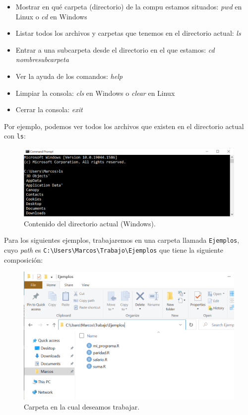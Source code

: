 \documentclass[
]{book}
\providecommand{\tightlist}{%
  \setlength{\itemsep}{0pt}\setlength{\parskip}{0pt}}
\begin{document}
\begin{itemize}
\tightlist
\item
  Mostrar en qué carpeta (directorio) de la compu estamos situados: \emph{pwd} en Linux o \emph{cd} en Windows
\item
  Listar todos los archivos y carpetas que tenemos en el directorio actual: \emph{ls}
\item
  Entrar a una subcarpeta desde el directorio en el que estamos: \emph{cd nombresubcarpeta}
\item
  Ver la ayuda de los comandos: \emph{help}
\item
  Limpiar la consola: \emph{cls} en Windows o \emph{clear} en Linux
\item
  Cerrar la consola: \emph{exit}
\end{itemize}

Por ejemplo, podemos ver todos los archivos que existen en el directorio actual con \texttt{ls}:

\begin{figure}

{\centering \includegraphics[width=0.8\linewidth]{images/07_otros/terminal3} 

}

\caption{Contenido del directorio actual (Windows).}\label{fig:unnamed-chunk-177}
\end{figure}

Para los siguientes ejemplos, trabajaremos en una carpeta llamada \texttt{Ejemplos}, cuyo \emph{path} es \texttt{C:\textbackslash{}Users\textbackslash{}Marcos\textbackslash{}Trabajo\textbackslash{}Ejemplos} que tiene la siguiente composición:

\begin{figure}

{\centering \includegraphics[width=0.8\linewidth]{images/07_otros/terminal4} 

}

\caption{Carpeta en la cual deseamos trabajar.}\label{fig:unnamed-chunk-178}
\end{figure}
\end{document}
